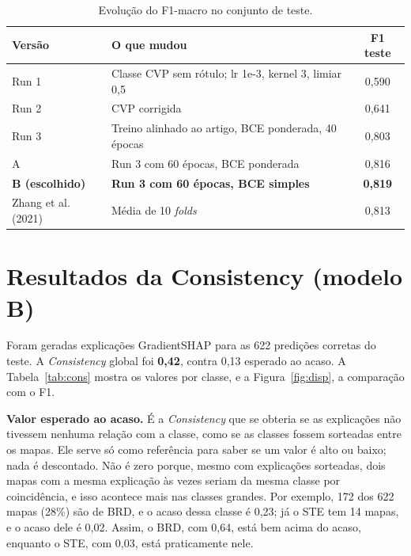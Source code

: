 \documentclass[11pt,a4paper]{article}
\begin{document}
\begin{table}[h]
\centering
\small
\caption{Evolução do F1-macro no conjunto de teste.}
\label{tab:f1}
\begin{tabularx}{\textwidth}{lXc}
\toprule
\textbf{Versão} & \textbf{O que mudou} & \textbf{F1 teste} \\
\midrule
Run 1 & Classe CVP sem rótulo; lr 1e-3, kernel 3, limiar 0,5 & 0,590 \\
Run 2 & CVP corrigida & 0,641 \\
Run 3 & Treino alinhado ao artigo, BCE ponderada, 40 épocas & 0,803 \\
A & Run 3 com 60 épocas, BCE ponderada & 0,816 \\
\textbf{B (escolhido)} & \textbf{Run 3 com 60 épocas, BCE simples} & \textbf{0,819} \\
\midrule
Zhang et al. (2021) & Média de 10 \textit{folds} & 0,813 \\
\bottomrule
\end{tabularx}
\end{table}

\section{Resultados da Consistency (modelo B)}
\label{sec:resultados}

Foram geradas explicações GradientSHAP para as 622 predições corretas do teste. A \textit{Consistency} global foi \textbf{0,42}, contra 0,13 esperado ao acaso. A Tabela~\ref{tab:cons} mostra os valores por classe, e a Figura~\ref{fig:disp}, a comparação com o F1.

\textbf{Valor esperado ao acaso.} É a \textit{Consistency} que se obteria se as explicações não tivessem nenhuma relação com a classe, como se as classes fossem sorteadas entre os mapas. Ele serve só como referência para saber se um valor é alto ou baixo; nada é descontado. Não é zero porque, mesmo com explicações sorteadas, dois mapas com a mesma explicação às vezes seriam da mesma classe por coincidência, e isso acontece mais nas classes grandes. Por exemplo, 172 dos 622 mapas (28\%) são de BRD, e o acaso dessa classe é 0,23; já o STE tem 14 mapas, e o acaso dele é 0,02. Assim, o BRD, com 0,64, está bem acima do acaso, enquanto o STE, com 0,03, está praticamente nele.
\end{document}
